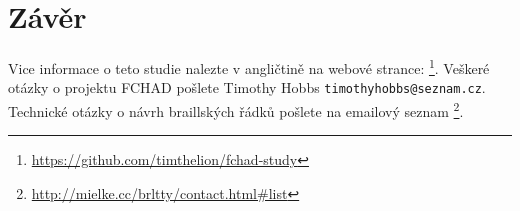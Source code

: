 \chapter{Závěr}

Vice informace o teto studie nalezte v angličtině na webové strance: \footnote{\url{https://github.com/timthelion/fchad-study}}.  Veškeré otázky o projektu FCHAD pošlete Timothy Hobbs {\tt timothyhobbs@seznam.cz}.  Technické otázky o návrh braillských řádků pošlete na emailový seznam
\footnote{\url{ http://mielke.cc/brltty/contact.html#list}}.



